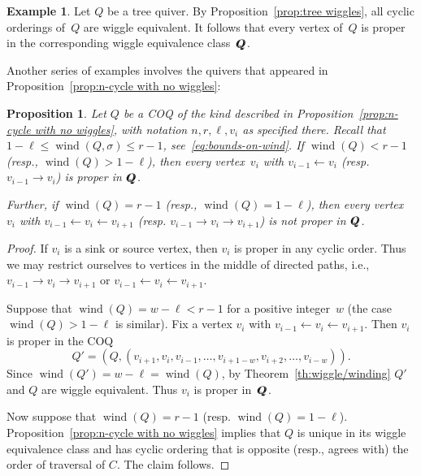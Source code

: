 \documentclass[11pt, letterpaper]{amsart}
\newcommand{\wiggleQ}{Q \hspace{-7pt} Q}%
\newtheorem{proposition}[theorem]{Proposition}
\theoremstyle{definition}
\newtheorem{example}[theorem]{Example}
\numberwithin{equation}{section}
\def\wind{{\operatorname{wind}}}
\begin{document}
\begin{example}
\label{eg:tree-proper}
Let $Q$ be a tree quiver. 
By Proposition~\ref{prop:tree wiggles}, all cyclic orderings of~$Q$ are wiggle equivalent.
It follows that every vertex of~$Q$ is proper in the corresponding wiggle equivalence class~$\wiggleQ$. 
\end{example}

Another series of examples involves the quivers that appeared in 
Proposition~\ref{prop:n-cycle with no wiggles}: 

\begin{proposition}
\label{prop:n-cycle proper vertices}
Let $Q$ be a COQ of the kind described in Proposition~\ref{prop:n-cycle with no wiggles}, 
with notation $n, r, \ell, v_i$ as specified there. 
%
Recall that $1-\ell\le \wind(Q,\sigma)\le r-1$, see~\eqref{eq:bounds-on-wind}. 
If $\wind(Q) < r-1$ (resp., $\wind(Q) > 1-\ell$), then every vertex~$v_i$ with $v_{i-1} \leftarrow v_i$ (resp. $v_{i-1} \rightarrow v_i$) is proper in $\wiggleQ$.

Further, if $\wind(Q) = r-1$ (resp., $\wind(Q) = 1-\ell$), then every vertex~$v_i$ with $v_{i-1} \leftarrow v_i \leftarrow v_{i+1}$ (resp. $v_{i-1} \rightarrow v_i \rightarrow v_{i+1}$) is not proper in $\wiggleQ$.
\end{proposition}

\begin{proof}
If $v_i$ is a sink or source vertex, then $v_i$ is proper in any cyclic order.
Thus we may restrict ourselves to vertices in the middle of directed paths, 
i.e., $v_{i-1} \rightarrow v_i \rightarrow v_{i+1}$ or $v_{i-1} \leftarrow v_i \leftarrow v_{i+1}$.

Suppose that $\wind(Q) = w- \ell < r-1$ for a positive integer~$w$ (the case $\wind(Q)>1-\ell$ is similar).
Fix a vertex $v_i$ with $v_{i-1} \leftarrow v_i \leftarrow v_{i+1}$.
Then $v_i$ is proper in the COQ 
\begin{equation*}
Q' = (Q, (v_{i+1}, v_i, v_{i-1}, \ldots , v_{i+1-w}, v_{i+2}, \ldots, v_{i-w})).
\end{equation*}
Since $\wind(Q') = w-\ell = \wind(Q)$, by Theorem~\ref{th:wiggle/winding} $Q'$ and $Q$ are wiggle equivalent.
Thus $v_i$ is proper in~$\wiggleQ$.

Now suppose that $\wind(Q) = r-1$ (resp. $\wind(Q) = 1-\ell$). 
Proposition~\ref{prop:n-cycle with no wiggles} implies that $Q$ is unique in its wiggle equivalence class %
and has cyclic ordering that is opposite (resp., agrees with) the order of traversal of $C$. %
The claim follows. %
\end{proof}
\end{document}
